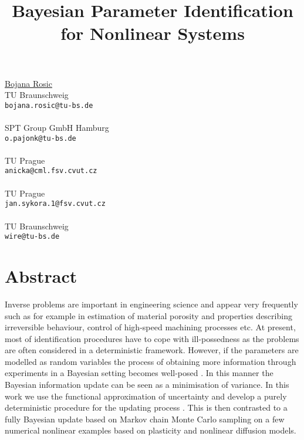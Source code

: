 \title{Bayesian Parameter Identification for Nonlinear Systems}
 \author{} \institute{}
\maketitle
\begin{center}
{\large \underline{Bojana Rosic}}\\
TU Braunschweig\\
{\tt bojana.rosic@tu-bs.de}
\\ \vspace{4mm}{\large Oliver Pajonk}\\
SPT Group GmbH Hamburg\\
{\tt o.pajonk@tu-bs.de}
\\ \vspace{4mm}{\large Anna Kucerova}\\
TU Prague\\
{\tt anicka@cml.fsv.cvut.cz}
\\ \vspace{4mm}{\large Jan Sykora}\\
TU Prague\\
{\tt jan.sykora.1@fsv.cvut.cz}
\\ \vspace{4mm}{\large Hermann G. Matthies}\\
TU Braunschweig\\
{\tt wire@tu-bs.de}

\end{center}

\section*{Abstract}

Inverse problems are important in engineering science and appear very frequently 
such as for example in estimation of material porosity and
properties describing irreversible behaviour, control of high-speed machining processes etc. At present,  
most of identification procedures have to cope
with ill-possedness as the problems are often considered in a deterministic framework. 
However, if  the parameters are modelled as random variables the process of obtaining more information 
through experiments in a Bayesian setting
becomes well-posed \cite{Tarantola}. In this manner the Bayesian information update can be seen as a minimisation of 
variance. In this work 
we use the functional approximation of uncertainty and develop a purely deterministic procedure for the 
updating process \cite{Rosic,Pajonk}. This is then contrasted to a fully Bayesian update based on Markov chain Monte Carlo \cite{Gamerman}
 sampling on a few numerical nonlinear examples
based on plasticity and nonlinear diffusion models.


